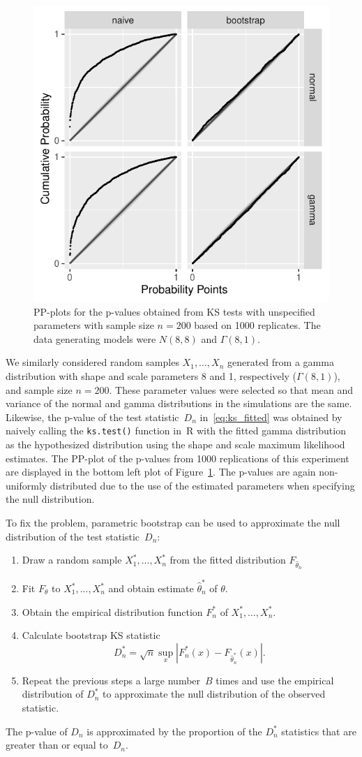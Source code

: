 \documentclass[12pt, letterpaper]{article}
\begin{document}
\begin{figure}[tbp]
  \centering
  \includegraphics[width=.5\textwidth]{pp_f.pdf}
  \caption{PP-plots for the p-values obtained from KS tests with unspecified
    parameters with sample size $n = 200$ based on 1000 replicates. The data
    generating models were $N(8, 8)$ and $\Gamma(8, 1)$.
  }
  \label{fig:pp_f}
\end{figure}


We similarly considered random samples $X_1, \ldots, X_n$ 
generated from a gamma distribution with shape and scale parameters 8 and 1, 
respectively ($\Gamma(8,1)$), and sample size $n=200$. These parameter values 
were selected so that mean and variance of the normal and gamma distributions 
in the simulations are the same. Likewise, the p-value of the test 
statistic~$D_n$ in~\eqref{eq:ks_fitted} was obtained by naively calling the
\texttt{ks.test()} function in~R with the fitted gamma distribution as the
hypothesized distribution using the shape and scale maximum likelihood 
estimates. The PP-plot of the p-values from 1000 replications of this 
experiment are displayed in the bottom left plot of Figure~\ref{fig:pp_f}. The
p-values are again non-uniformly distributed due to the use of the 
estimated parameters when specifying the null distribution.


To fix the problem, parametric bootstrap can be used to approximate the null
distribution of the test statistic~$D_n$:
\begin{enumerate}
\item
  Draw a random sample $X_1^*,...,X_n^*$ from the fitted distribution
  $F_{\hat\theta_n}$
\item
  Fit $F_\theta$ to $X_1^*,...,X_n^*$ and obtain estimate 
	$\hat\theta_n^*$ of $\theta$.
\item
  Obtain the empirical distribution function $F_n^*$ of
  $X_1^*, \ldots,  X_n^*$.
\item
  Calculate bootstrap KS statistic
  \[
    D_n^* = \sqrt{n} \sup_x | F_n^* (x)- F_{\hat\theta_n^*}(x) |.
  \]
\item
  Repeat the previous steps a large number~$B$ times and use the empirical
  distribution of $D_n^*$ to approximate the null distribution of the observed
  statistic.
\end{enumerate}
The p-value of $D_n$ is approximated by the proportion of the $D_n^*$ 
statistics that are greater than or equal to~$D_n$.
\end{document}
